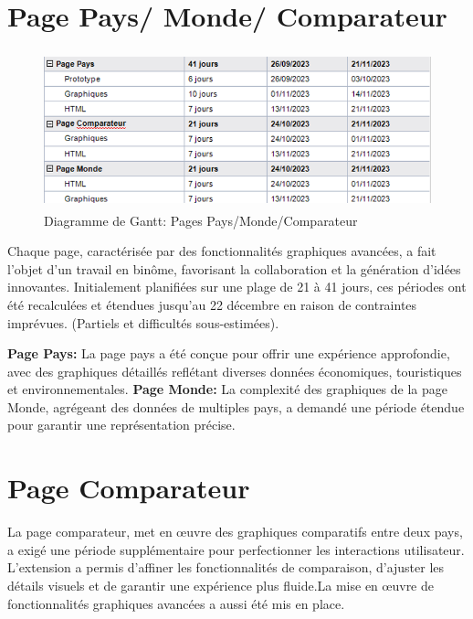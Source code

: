 \documentclass[mstat,12pt]{unswthesis}
\begin{document}
\begin{adjustwidth}{-2cm}{}
\newpage

\hypertarget{page-pays-monde-comparateur}{%
\section{Page Pays/ Monde/
Comparateur}\label{page-pays-monde-comparateur}}

\begin{figure}
\centering
\includegraphics[width=12cm,height=4.52cm]{images/html_gantt.png}
\caption{Diagramme de Gantt: Pages Pays/Monde/Comparateur}
\end{figure}

Chaque page, caractérisée par des fonctionnalités graphiques avancées, a
fait l'objet d'un travail en binôme, favorisant la collaboration et la
génération d'idées innovantes. Initialement planifiées sur une plage de
21 à 41 jours, ces périodes ont été recalculées et étendues jusqu'au 22
décembre en raison de contraintes imprévues. (Partiels et difficultés
sous-estimées).

\textbf{Page Pays:} La page pays a été conçue pour offrir une expérience
approfondie, avec des graphiques détaillés reflétant diverses données
économiques, touristiques et environnementales. \textbf{Page Monde:} La
complexité des graphiques de la page Monde, agrégeant des données de
multiples pays, a demandé une période étendue pour garantir une
représentation précise.

\hypertarget{page-comparateur}{%
\section{Page Comparateur}\label{page-comparateur}}

La page comparateur, met en œuvre des graphiques comparatifs entre deux
pays, a exigé une période supplémentaire pour perfectionner les
interactions utilisateur. L'extension a permis d'affiner les
fonctionnalités de comparaison, d'ajuster les détails visuels et de
garantir une expérience plus fluide.La mise en œuvre de fonctionnalités
graphiques avancées a aussi été mis en place.


\end{adjustwidth}
\end{document}
